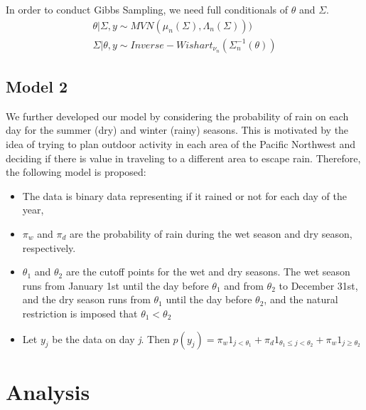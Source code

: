 \documentclass{article}
\begin{document}
In order to conduct Gibbs Sampling, we need full conditionals of $\theta$ and $\Sigma$. 
\begin{align*}
\theta | \Sigma, y \sim MVN(\mu_n(\Sigma), \Lambda_n(\Sigma)))  \\
\Sigma | \theta, y \sim Inverse - Wishart_{\nu_n} (\Sigma_n^{-1}(\theta))
\end{align*}


\subsection{Model 2}

We further developed our model by considering the probability of rain on each day for the summer (dry) and winter (rainy) seasons. This is motivated by the idea of trying to plan outdoor activity in each area of the Pacific Northwest and deciding if there is value in traveling to a different area to escape rain.
Therefore, the following model is proposed:
\begin{itemize}
\item The data is binary data representing if it rained or not for each day of the year,
\item $\pi_w$ and $\pi_d$ are the probability of rain during the wet season and dry season, respectively.
\item $\theta_1$ and $\theta_2$ are the cutoff points for the wet and dry seasons. The wet season runs from January 1st until the day before $\theta_1$ and from $\theta_2$ to December 31st, and the dry season runs from $\theta_1$ until the day before $\theta_2$, and the natural restriction is imposed that $\theta_1 < \theta_2$
\item Let $y_j$ be the data on day \textit{j}. Then $p(y_j) = \pi_w  1_{j < \theta_1} + \pi_d  1_{\theta_1\leq j < \theta_2} +\pi_w  1_{j \geq \theta_2} $
\end{itemize}

\section{Analysis}
\end{document}
